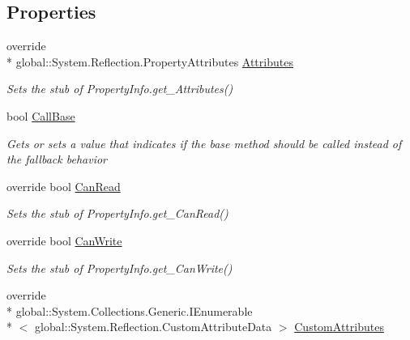 \subsection*{Properties}
\begin{DoxyCompactItemize}
\item 
override \\*
global\-::\-System.\-Reflection.\-Property\-Attributes \hyperlink{class_system_1_1_reflection_1_1_fakes_1_1_stub_property_info_ab90e680240d694c23f985cdde9e7aada}{Attributes}
\begin{DoxyCompactList}\small\item\em Sets the stub of Property\-Info.\-get\-\_\-\-Attributes()\end{DoxyCompactList}\item 
bool \hyperlink{class_system_1_1_reflection_1_1_fakes_1_1_stub_property_info_af715d54ea74286205c13e6d2b1011fdf}{Call\-Base}
\begin{DoxyCompactList}\small\item\em Gets or sets a value that indicates if the base method should be called instead of the fallback behavior\end{DoxyCompactList}\item 
override bool \hyperlink{class_system_1_1_reflection_1_1_fakes_1_1_stub_property_info_afa038b11f19e3376b66e1beaf33c728c}{Can\-Read}
\begin{DoxyCompactList}\small\item\em Sets the stub of Property\-Info.\-get\-\_\-\-Can\-Read()\end{DoxyCompactList}\item 
override bool \hyperlink{class_system_1_1_reflection_1_1_fakes_1_1_stub_property_info_a7e3c30642e3e85566324e2af93eb1577}{Can\-Write}
\begin{DoxyCompactList}\small\item\em Sets the stub of Property\-Info.\-get\-\_\-\-Can\-Write()\end{DoxyCompactList}\item 
override \\*
global\-::\-System.\-Collections.\-Generic.\-I\-Enumerable\\*
$<$ global\-::\-System.\-Reflection.\-Custom\-Attribute\-Data $>$ \hyperlink{class_system_1_1_reflection_1_1_fakes_1_1_stub_property_info_a1946fed4f236baa1d8daa4c98472713f}{Custom\-Attributes}

\end{DoxyCompactItemize}
